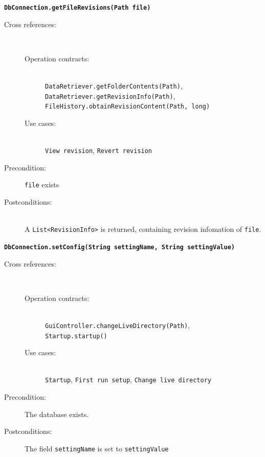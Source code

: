 \documentclass[12pt,a4paper]{article}
\begin{document}
\textbf{\texttt{DbConnection.getFileRevisions(Path file)}}
	\begin{description}
	\item[Cross references:] \hfill \vspace{-4ex}  \\
		\begin{description} 
		\item[Operation contracts:] \hfill \\
			\texttt{DataRetriever.getFolderContents(Path)},\\
			\texttt{DataRetriever.getRevisionInfo(Path)},\\
			\texttt{FileHistory.obtainRevisionContent(Path, long)}
		\item[Use cases:] \hfill \\
			\texttt{View revision}, \texttt{Revert revision}
	\end{description}
	\item[Precondition:] \texttt{file} exists
	\item[Postconditions:] \hfill \\
	A \texttt{List<RevisionInfo>} is returned, containing revision infomation of \texttt{file}.
\end{description}

\vspace{0.75cm}

\textbf{\texttt{DbConnection.setConfig(String settingName, String settingValue)}}
\begin{description}
	\item[Cross references:] \hfill \vspace{-4ex}  \\
		\begin{description} 
		\item[Operation contracts:] \hfill \\
			\texttt{GuiController.changeLiveDirectory(Path)},\\
			\texttt{Startup.startup()}
		\item[Use cases:] \hfill \\
			\texttt{Startup}, \texttt{First run setup}, \texttt{Change live directory}
	\end{description}
	\item[Precondition:] The database exists.
	\item[Postconditions:] The field \texttt{settingName} is set to \texttt{settingValue}
\end{description}
\end{document}
